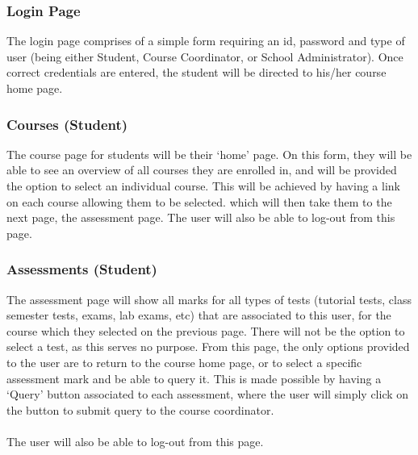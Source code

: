 \documentclass[paper=a4, fontsize=11pt]{scrartcl}
\numberwithin{equation}{section}		%
\numberwithin{figure}{section}			%
\numberwithin{table}{section}				%
\begin{document}
\subsubsection{Login Page}
The login page comprises of a simple form requiring an id, password and type of user (being either Student, Course Coordinator, or School Administrator). Once correct credentials are entered, the student will be directed to his/her course home page.

\subsubsection{Courses (Student)}
The course page for students will be their ‘home’ page. On this form, they will be able to see an overview of all courses they are enrolled in, and will be provided the option to select an individual course. This will be achieved by having a link on each course allowing them to be selected. which will then take them to the next page, the assessment page. The user will also be able to log-out from this page.

\subsubsection{Assessments (Student)}
The assessment page will show all marks for all types of tests (tutorial tests, class semester tests, exams, lab exams, etc) that are associated to this user, for the course which they selected on the previous page. There will not be the option to select a test, as this serves no purpose. From this page, the only options provided to the user are to return to the course home page, or to select a specific assessment mark and be able to query it. This is made possible by having a ‘Query’ button associated to each assessment, where the user will simply click on the button to submit  query to the course coordinator.\\\\The user will also be able to log-out from this page.
\end{document}
